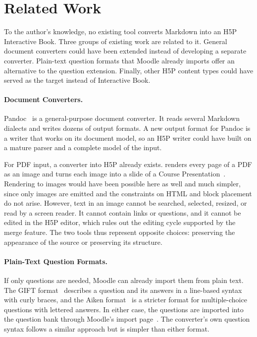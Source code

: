 \section{Related Work}
\label{sec:related_work}

To the author's knowledge, no existing tool converts Markdown into an H5P Interactive Book.
Three groups of existing work are related to it.
General document converters could have been extended instead of developing a separate converter.
Plain-text question formats that Moodle already imports offer an alternative to the question extension.
Finally, other H5P content types could have served as the target instead of Interactive Book.

\paragraph{Document Converters.}
Pandoc~\cite{Pandoc} is a general-purpose document converter.
It reads several Markdown dialects and writes dozens of output formats.
A new output format for Pandoc is a writer that works on its document model, so an H5P writer could
have built on a mature parser and a complete model of the input.

For PDF input, a converter into H5P already exists.
 renders every page of a PDF as an image and turns each image into a
slide of a Course Presentation~\cite{Anandh:PdfToH5P}.
Rendering to images would have been possible here as well and much simpler, since only images are
emitted and the constraints on HTML and block placement do not arise.
However, text in an image cannot be searched, selected, resized, or read by a screen reader. It cannot
contain links or questions, and it cannot be edited in the H5P editor, which rules out the editing cycle supported by the merge feature.
The two tools thus represent opposite choices: preserving the appearance of the source or
preserving its structure.

\paragraph{Plain-Text Question Formats.}
If only questions are needed, Moodle can already import them from plain text.
The GIFT format~\cite{Moodle:GIFT} describes a question and its answers in a line-based syntax with
curly braces, and the Aiken format~\cite{Moodle:Aiken} is a stricter format for multiple-choice questions
with lettered answers.
In either case, the questions are imported into the question bank through Moodle's import page~\cite{Moodle:ImportQuestions}.
The converter's own question syntax follows a similar approach but is simpler than either format.

